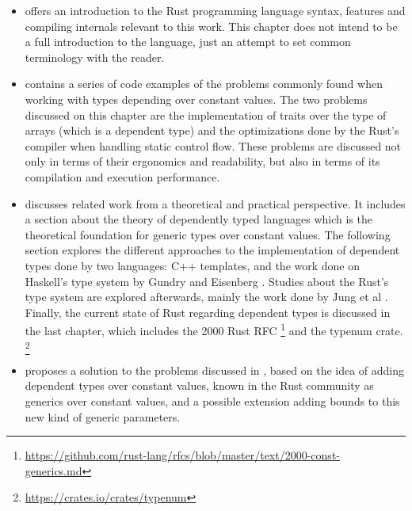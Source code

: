 \begin{itemize}
    \item {} offers an introduction to the Rust
        programming language syntax, features and compiling internals relevant
        to this work. This chapter does not intend to be a full introduction to
        the language, just an attempt to set common terminology with the
        reader.
    \item {} contains a series of code examples of the
        problems commonly found when working with types depending over constant
        values. The two problems discussed on this chapter are the
        implementation of traits over the type of arrays (which is a dependent
        type) and the optimizations done by the Rust's compiler when handling
        static control flow. These problems are discussed not only in terms of
        their ergonomics and readability, but also in terms of its compilation
        and execution performance.
    \item {} discusses related work from a theoretical
        and practical perspective. It includes a section about the theory of
        dependently typed languages which is the theoretical foundation for
        generic types over constant values. The following section explores the
        different approaches to the implementation of dependent types done by
        two languages: C++ templates, and the work done on Haskell's type
        system by Gundry \cite{gundry} and Eisenberg \cite{eisenberg}. Studies
        about the Rust's type system are explored afterwards, mainly the work
        done by Jung et al \cite{ralf}. Finally, the current state of Rust
        regarding dependent types is discussed in the last chapter, which
        includes the 2000 Rust RFC
        \footnote{\url{https://github.com/rust-lang/rfcs/blob/master/text/2000-const-generics.md}}
        and the typenum crate.
        \footnote{\url{https://crates.io/crates/typenum}}
    \item {} proposes a solution to the problems discussed in
        , based on the idea of adding dependent types
        over constant values, known in the Rust community as generics over
        constant values, and a possible extension adding bounds to this new
        kind of generic parameters.
\end{itemize}
